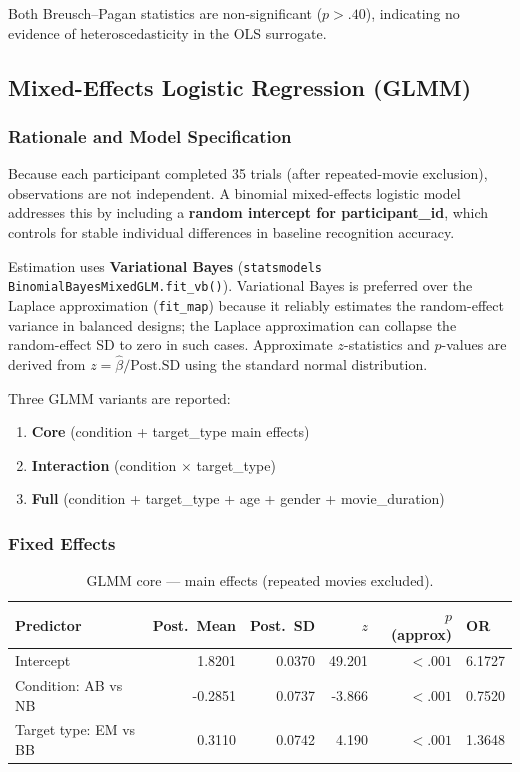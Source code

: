 \documentclass[12pt,a4paper]{article}
\begin{document}
\noindent Both Breusch--Pagan statistics are non-significant ($p > .40$), indicating no evidence
of heteroscedasticity in the OLS surrogate.


\subsection{Mixed-Effects Logistic Regression (GLMM)}

\subsubsection{Rationale and Model Specification}
Because each participant completed 35 trials (after repeated-movie exclusion), observations are
not independent. A binomial mixed-effects logistic model addresses this by including a
\textbf{random intercept for participant\_id}, which controls for stable individual differences
in baseline recognition accuracy.

Estimation uses \textbf{Variational Bayes} (\texttt{statsmodels BinomialBayesMixedGLM.fit\_vb()}).
Variational Bayes is preferred over the Laplace approximation (\texttt{fit\_map}) because it
reliably estimates the random-effect variance in balanced designs; the Laplace approximation
can collapse the random-effect SD to zero in such cases.
Approximate $z$-statistics and $p$-values are derived from $z = \hat\beta / \text{Post.SD}$
using the standard normal distribution.

Three GLMM variants are reported:
\begin{enumerate}[nosep]
  \item \textbf{Core} (condition + target\_type main effects)
  \item \textbf{Interaction} (condition $\times$ target\_type)
  \item \textbf{Full} (condition + target\_type + age + gender + movie\_duration)
\end{enumerate}

\subsubsection{Fixed Effects}

\begin{table}[H]
\centering
\footnotesize
\begin{tabular}{lrrrrl}
\hline
\textbf{Predictor} & \textbf{Post.\ Mean} & \textbf{Post.\ SD} & \textbf{$z$} & \textbf{$p$ (approx)} & \textbf{OR} \\
\hline
    Intercept & 1.8201 & 0.0370 & 49.201 & $<.001$ & 6.1727 \\
    Condition: AB vs NB & -0.2851 & 0.0737 & -3.866 & $<.001$ & 0.7520 \\
    Target type: EM vs BB & 0.3110 & 0.0742 & 4.190 & $<.001$ & 1.3648 \\
\hline
\end{tabular}
\caption{GLMM core --- main effects (repeated movies excluded).}
\label{tab:glmm_core}
\end{table}
\end{document}
